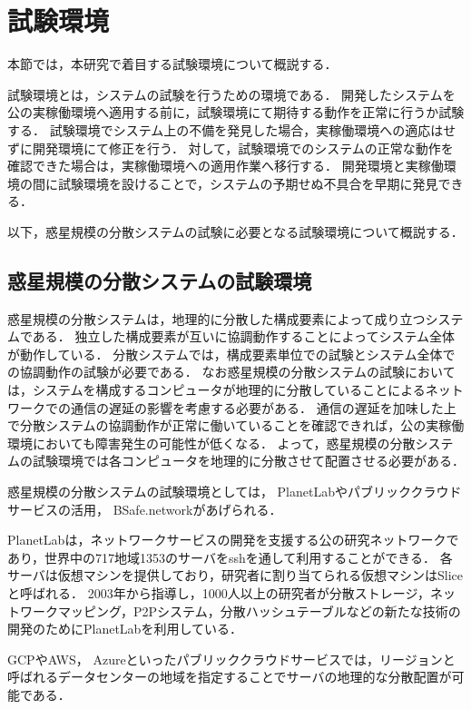 \section{試験環境}
\label{bg:staging}

本節では，本研究で着目する試験環境について概説する．

試験環境とは，システムの試験を行うための環境である．
開発したシステムを公の実稼働環境へ適用する前に，試験環境にて期待する動作を正常に行うか試験する．
試験環境でシステム上の不備を発見した場合，実稼働環境への適応はせずに開発環境にて修正を行う．
対して，試験環境でのシステムの正常な動作を確認できた場合は，実稼働環境への適用作業へ移行する．
開発環境と実稼働環境の間に試験環境を設けることで，システムの予期せぬ不具合を早期に発見できる．

以下，惑星規模の分散システムの試験に必要となる試験環境について概説する．

\subsection{惑星規模の分散システムの試験環境}
\label{bg:staging:planetary-scale-distributed-system}

惑星規模の分散システムは，地理的に分散した構成要素によって成り立つシステムである．
独立した構成要素が互いに協調動作することによってシステム全体が動作している．
分散システムでは，構成要素単位での試験とシステム全体での協調動作の試験が必要である．
なお惑星規模の分散システムの試験においては，システムを構成するコンピュータが地理的に分散していることによるネットワークでの通信の遅延の影響を考慮する必要がある．
通信の遅延を加味した上で分散システムの協調動作が正常に働いていることを確認できれば，公の実稼働環境においても障害発生の可能性が低くなる．
よって，惑星規模の分散システムの試験環境では各コンピュータを地理的に分散させて配置させる必要がある．

惑星規模の分散システムの試験環境としては， PlanetLabやパブリッククラウドサービスの活用， BSafe.networkがあげられる．

PlanetLabは，ネットワークサービスの開発を支援する公の研究ネットワークであり，世界中の717地域1353のサーバをsshを通して利用することができる．
各サーバは仮想マシンを提供しており，研究者に割り当てられる仮想マシンはSliceと呼ばれる．
2003年から指導し，1000人以上の研究者が分散ストレージ，ネットワークマッピング，P2Pシステム，分散ハッシュテーブルなどの新たな技術の開発のためにPlanetLabを利用している．

GCPやAWS， Azureといったパブリッククラウドサービスでは，リージョンと呼ばれるデータセンターの地域を指定することでサーバの地理的な分散配置が可能である．

